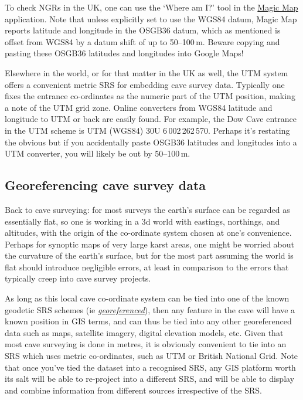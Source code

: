 \documentclass[]{article}
\begin{document}
To check NGRs in the UK, one can use the `Where am I?' tool in the
\href{http://www.natureonthemap.naturalengland.org.uk/MagicMap.aspx}{Magic
Map} application. Note that unless explicitly set to use the WGS84
datum, Magic Map reports latitude and longitude in the OSGB36 datum,
which as mentioned is offset from WGS84 by a datum shift of up to
50--100\,m. Beware copying and pasting these OSGB36 latitudes and
longitudes into Google Maps!

Elsewhere in the world, or for that matter in the UK as well, the UTM
system offers a convenient metric SRS for embedding cave survey data.
Typically one fixes the entrance co-ordinates as the numeric part of the
UTM position, making a note of the UTM grid zone. Online converters from
WGS84 latitude and longitude to UTM or back are easily found. For
example, the Dow Cave entrance in the UTM scheme is UTM (WGS84)
30U 6\,002\,262\,570. Perhaps it's restating the obvious but if you
accidentally paste OSGB36 latitudes and longitudes into a UTM converter,
you will likely be out by 50--100\,m.

\subsection{Georeferencing cave survey
data}\label{georeferencing-cave-survey-data}

Back to cave surveying: for most surveys the earth's surface can be
regarded as essentially flat, so one is working in a 3d world with
eastings, northings, and altitudes, with the origin of the co-ordinate
system chosen at one's convenience. Perhaps for synoptic maps of very
large karst areas, one might be worried about the curvature of the
earth's surface, but for the most part assuming the world is flat should
introduce negligible errors, at least in comparison to the errors that
typically creep into cave survey projects.

As long as this local cave co-ordinate system can be tied into one of
the known geodetic SRS schemes (ie
\href{https://en.wikipedia.org/wiki/Georeferencing}{\emph{georeferenced}}),
then any feature in the cave will have a known position in GIS terms,
and can thus be tied into any other georeferenced data such as maps,
satellite imagery, digital elevation models, etc. Given that most cave
surveying is done in metres, it is obviously convenient to tie into an
SRS which uses metric co-ordinates, such as UTM or British National
Grid. Note that once you've tied the dataset into a recognised SRS, any
GIS platform worth its salt will be able to re-project into a different
SRS, and will be able to display and combine information from different
sources irrespective of the SRS.
\end{document}
